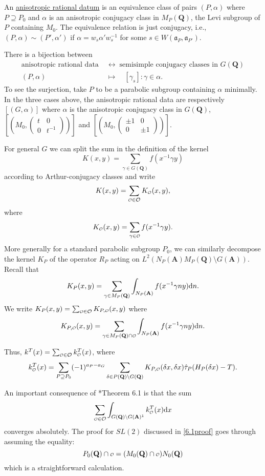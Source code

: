 \documentclass[11pt]{amsart}
\def\apg{a_{P} - a_{G}}
\def\A{\mathbf A}
\def\Q{\mathbf Q}
\def\O{\mathcal O}
\def\o{\scalebox{0.8}{$\scriptstyle\mathcal{O}$}}
\def\aaa{\mathfrak a}
\def\d{\text d}
\def\bs{\setminus}
\def\Ltwo{L^2}
\theoremstyle{remark}
\begin{document}
An \underline{anisotropic rational datum} is an equivalence class of pairs $(P, \alpha)$ where $P \supseteq P_0$ and $\alpha$ is an anisotropic conjugacy class in $M_P(\Q)$, the Levi subgroup of $P$ containing $M_0$. The equivalence relation is just conjugacy, i.e., $(P, \alpha) \sim (P', \alpha')$ if $\alpha = w_s \alpha' w_s^{-1}$ for some $s \in W(\aaa_P, \aaa_{P'})$. 

There is a bijection between 
\begin{align*}
	\text{anisotropic rational data} \; & \leftrightarrow \; \text{semisimple conjugacy classes in } G(\Q) \\
	(P, \alpha) \quad & \mapsto \quad [\gamma_s] : \gamma \in \alpha.
\end{align*}
To see the surjection, take $P$ to be a parabolic subgroup containing $\alpha$ minimally. In the three cases above, the anisotropic rational data are respectively $[(G, \alpha)]$ where $\alpha$ is the anisotropic conjugacy class in $G(\Q)$, $\left[ \left(M_0, \begin{pmatrix} t & 0 \\ 0 & t^{-1} \end{pmatrix} \right) \right]$ and $\left[ \left(M_0, \begin{pmatrix} \pm 1 & 0 \\ 0 & \pm 1 \end{pmatrix} \right)\right]$.

For general $G$ we can split the sum in the definition of the kernel
\[ K(x, y) = \sum_{\gamma \in G(\Q)} f(x^{-1} \gamma y) \]
according to Arthur-conjugacy classes and write
\[ K(x, y) = \sum_{\o \in \O} K_{\o}(x, y),\]
where
\[ K_{\o}(x, y) = \sum_{\gamma \in \o} f(x^{-1}\gamma y). \]
More generally for a standard parabolic subgroup $P_0$, we can similarly decompose the kernel $K_P$ of the operator $R_P$ acting on $\Ltwo(N_P(\A) M_P(\Q) \bs G(\A))$. Recall that
\[ K_P(x, y) = \sum_{\gamma \in M_P(\Q)} \int_{N_P(\A)} f(x^{-1} \gamma n y) \d n. \]
We write $K_P(x, y) = \sum_{\o \in \O} K_{P, \o} (x, y)$ where
\[ K_{P, \o}(x, y) = \sum_{\gamma \in M_P(\Q) \cap \o} \int_{N_P(\A)} f(x^{-1} \gamma n y) \d n. \]

Thus, $k^T(x) = \sum_{\o \in \O} k^T_{\o}(x)$, where
\[ k^T_{\o}(x) = \sum_{P \supseteq P_0} (-1)^{\apg} \sum_{\delta\in P(\Q)\bs G(\Q)} K_{P, \o}(\delta x, \delta x) \hat\tau_P(H_P(\delta x) - T). \]

An important consequence of \cite{clay}*{Theorem 6.1} is that the sum 
\begin{equation}
	\sum_{\o \in \O} \int_{G(\Q) \bs G(\A)^1} k_{\o}^T(x) \d x 
\end{equation}
converges absolutely. The proof for $SL(2)$ discussed in \cref{6.1proof} goes through assuming the equality:
\[ P_0(\Q) \cap \o = (M_0(\Q) \cap \o) N_0(\Q) \]
which is a straightforward calculation.
\end{document}
